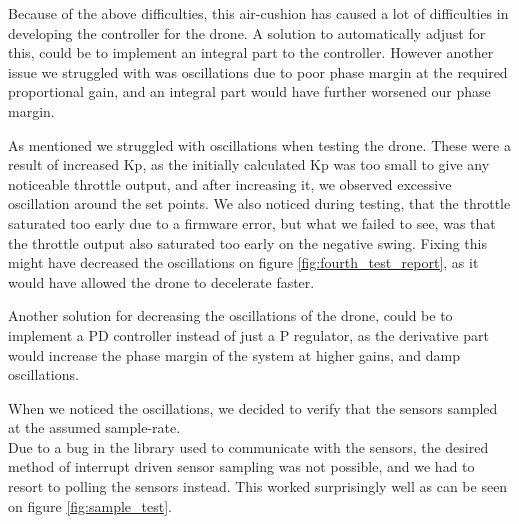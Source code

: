 Because of the above difficulties, this air-cushion has caused a lot of difficulties in developing the controller for the drone. A solution to automatically adjust for this, could be to implement an integral part to the controller. However another issue we struggled with was oscillations due to poor phase margin at the required proportional gain, and an integral part would have further worsened our phase margin. 


As mentioned we struggled with oscillations when testing the drone. These were a result of increased Kp, as the initially calculated Kp was too small to give any noticeable throttle output, and after increasing it, we observed excessive oscillation around the set points. We also noticed during testing, that the throttle saturated too early due to a firmware error, but what we failed to see, was that the throttle output also saturated too early on the negative swing. Fixing this might have decreased the oscillations on figure \ref{fig:fourth_test_report}, as it would have allowed the drone to decelerate faster.


Another solution for decreasing the oscillations of the drone, could be to implement a PD controller instead of just a P regulator, as the derivative part would increase the phase margin of the system at higher gains, and damp oscillations.

When we noticed the oscillations, we decided to verify that the sensors sampled at the assumed sample-rate.\\
Due to a bug in the library used to communicate with the sensors, the desired method of interrupt driven sensor sampling was not possible, and we had to resort to polling the sensors instead. This worked surprisingly well as can be seen on figure \ref{fig:sample_test}.

